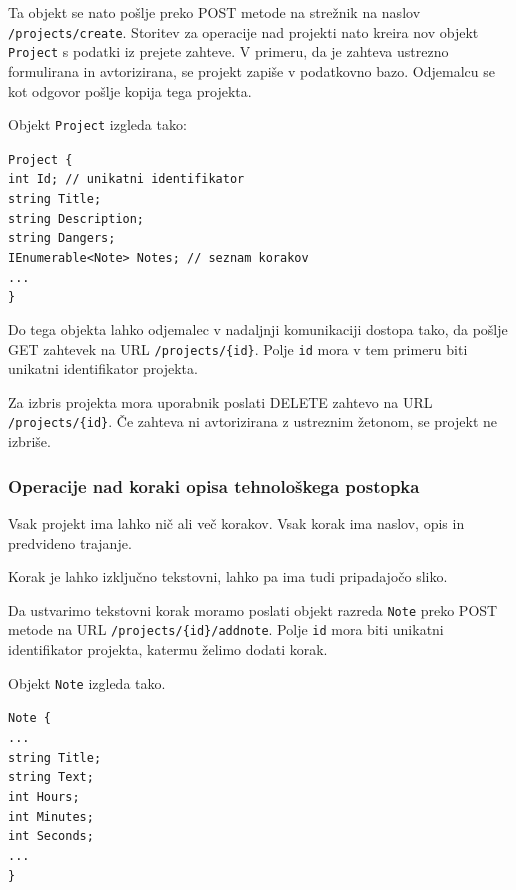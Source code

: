 \documentclass[a4paper, 12pt]{book}
\begin{document}
\noindent Ta objekt se nato pošlje preko POST metode na strežnik na naslov \texttt{/projects/create}.
Storitev za operacije nad projekti nato kreira nov objekt \texttt{Project} s podatki iz prejete zahteve.
V primeru, da je zahteva ustrezno formulirana in avtorizirana, se projekt zapiše v podatkovno bazo.
Odjemalcu se kot odgovor pošlje kopija tega projekta.

Objekt \texttt{Project} izgleda tako:

\noindent \texttt{Project \{ \\
int Id; // unikatni identifikator \\
string Title; \\
string Description; \\
string Dangers; \\
IEnumerable<Note> Notes; // seznam korakov \\
... \\
\}
}


Do tega objekta lahko odjemalec v nadaljnji komunikaciji dostopa tako, da pošlje GET zahtevek na URL \texttt{/projects/\{id\}}.
Polje \texttt{id} mora v tem primeru biti unikatni identifikator projekta.

Za izbris projekta mora uporabnik poslati DELETE zahtevo na URL \texttt{/projects/\{id\}}.
Če zahteva ni avtorizirana z ustreznim žetonom, se projekt ne izbriše.

\subsubsection{Operacije nad koraki opisa tehnološkega postopka}

Vsak projekt ima lahko nič ali več korakov.
Vsak korak ima naslov, opis in predvideno trajanje.

Korak je lahko izključno tekstovni, lahko pa ima tudi pripadajočo sliko.

Da ustvarimo tekstovni korak moramo poslati objekt razreda \texttt{Note} preko POST metode na URL \texttt{/projects/\{id\}/addnote}.
Polje \texttt{id} mora biti unikatni identifikator projekta, katermu želimo dodati korak.

Objekt \texttt{Note} izgleda tako.

\noindent \texttt{Note \{ \\
...\\ 
string Title; \\
string Text; \\
int Hours; \\
int Minutes; \\
int Seconds; \\
...\\ 
\} }
\end{document}
